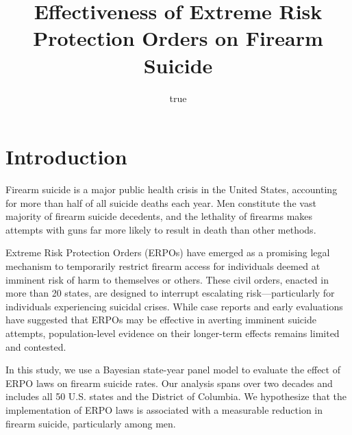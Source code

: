 \documentclass[
  11pt,
]{article}
\title{Effectiveness of Extreme Risk Protection Orders on Firearm
Suicide}
\author{true}
\date{}
\begin{document}
\maketitle

\section{Introduction}\label{introduction}

Firearm suicide is a major public health crisis in the United States,
accounting for more than half of all suicide deaths each year. Men
constitute the vast majority of firearm suicide decedents, and the
lethality of firearms makes attempts with guns far more likely to result
in death than other methods.

Extreme Risk Protection Orders (ERPOs) have emerged as a promising legal
mechanism to temporarily restrict firearm access for individuals deemed
at imminent risk of harm to themselves or others. These civil orders,
enacted in more than 20 states, are designed to interrupt escalating
risk---particularly for individuals experiencing suicidal crises. While
case reports and early evaluations have suggested that ERPOs may be
effective in averting imminent suicide attempts, population-level
evidence on their longer-term effects remains limited and contested.

In this study, we use a Bayesian state-year panel model to evaluate the
effect of ERPO laws on firearm suicide rates. Our analysis spans over
two decades and includes all 50 U.S. states and the District of
Columbia. We hypothesize that the implementation of ERPO laws is
associated with a measurable reduction in firearm suicide, particularly
among men.
\end{document}
